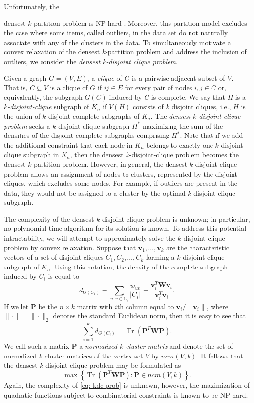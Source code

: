 \documentclass[twoside,11pt]{article}
\DeclareMathOperator{\tr}{{Tr}}
\renewcommand{\P}{\bs{P}}
\newcommand{\bs}{\boldsymbol}
\renewcommand{\v}{\bs{v}}
\newcommand{\W}{\bs {W}}
\newcommand{\0}{\bs{0}}
\newcommand{\bra}[1]{\ensuremath{\left\{ #1 \right\}}} %
\newcommand{\kdc}{\(k\)-disjoint-clique }
\begin{document}
Unfortunately, the {densest \(k\)-partition problem is NP-hard \citep[see][]{peng2007approximating}. Moreover, this partition model excludes the
	case where some items, called outliers, in the data set do not naturally associate 
	with any of the clusters in the data.
	To simultaneously motivate a convex relaxation of the densest \(k\)-partition
	problem and address the inclusion of outliers, we consider the \emph{densest
		\(k\)-disjoint clique problem}.
	
	Given a graph \(G=(V,E)\), a \emph{clique} of \(G\) is a pairwise
	adjacent subset of \(V\). That is, \(C \subseteq V\)
	is a clique of \(G\) if \(ij\in E\) for every pair of nodes \(i,j \in C\)
	or, equivalently, the subgraph \(G(C)\) induced by \(C\) is
	{complete}.
	We say that \(H\) is a \emph{\(k\)-disjoint-clique} subgraph of \(K_n\)
	if \(V(H)\) consists of \(k\) disjoint cliques, i.e., \(H\) is the union
	of \(k\) disjoint complete subgraphs of \(K_n\).
	The \emph{densest \(k\)-disjoint-clique problem} seeks a \(k\)-disjoint-clique
	subgraph \(H^*\) maximizing the sum of the densities of the disjoint
	complete subgraphs comprising \(H^*\).
	Note that if we add the additional constraint that each node in \(K_n\) belongs
	to exactly one \kdc subgraph in \(K_n\), then
	the densest \kdc problem becomes the densest \(k\)-partition problem.
	However, in general, the densest \kdc problem allows an assignment of nodes
	to clusters, represented by the disjoint cliques, which excludes
	some nodes. For example, if outliers are present in the data, they would not be assigned to a 
	cluster by the optimal \kdc subgraph.
	
	The complexity of the densest \kdc problem is unknown;
	in particular, no polynomial-time algorithm for its solution is known.
	To address this potential intractability, we will attempt to approximately solve the \kdc problem by convex
	relaxation.
	Suppose that \( \v_1, \dots, \v_k \) are the characteristic vectors 
	of a set of disjoint cliques \(C_1, C_2, \dots, C_k\) 
	forming a \kdc subgraph of \(K_n\).
	Using this notation, the density of the complete subgraph induced
	by \(C_i\) is equal to
	\[
	d_{G(C_i)} = \sum_{u, v \in C_{i}} \frac{w_{uv}}{|C_i|}
	= \frac{\v_i^T \W \v_i}{\v_i^T \v_i}.
	\]
	If we let \(\P\) be the \(n \times k\) matrix with \(i\)th column equal to \(\v_i/ \|\v_i\|\), where \(\|\cdot\| = \|\cdot\|_2\)
	denotes the standard Euclidean norm, then
	it is easy to see that
	\[
	\sum_{i=1}^k d_{G(C_i)} = \tr(\P^T \W \P).
	\]
	We call such a matrix \(\P\) a \emph{normalized \(k\)-cluster matrix} and denote the set of normalized \(k\)-cluster
	matrices of the vertex set \(V\) by \(ncm(V,k)\).
	It follows that the densest \kdc problem may be formulated as
	\begin{equation} \label{eq: kdc prob}
	\max \bra{ \tr(\P^T \W \P) : \P \in ncm(V,k) }.
	\end{equation}
	Again, the complexity of \eqref{eq: kdc prob} is unknown, however, the maximization of quadratic functions
	subject to combinatorial constraints is known to be NP-hard.
	
}
\end{document}
